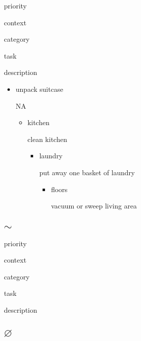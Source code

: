 \documentclass[]{book}
\begin{document}
priority

context

category

task

description

\begin{itemize}
\item
  \sharp 

  \pi 

  unpack suitcase

  NA

  \begin{itemize}
  \item
    \sharp 

    \pi 

    kitchen

    clean kitchen

    \begin{itemize}
    \item
      \sharp 

      \pi 

      laundry

      put away one basket of laundry

      \begin{itemize}
      \item
        \sharp 

        \pi 

        floors

        vacuum or sweep living area
      \end{itemize}
    \end{itemize}
  \end{itemize}
\end{itemize}

\hypertarget{sim}{%
\subsection{\texorpdfstring{\(\sim\)}{\textbackslash{}sim}}\label{sim}}

priority

context

category

task

description

\hypertarget{varnothing}{%
\subsection{\texorpdfstring{\(\varnothing\)}{\textbackslash{}varnothing}}\label{varnothing}}
\end{document}
